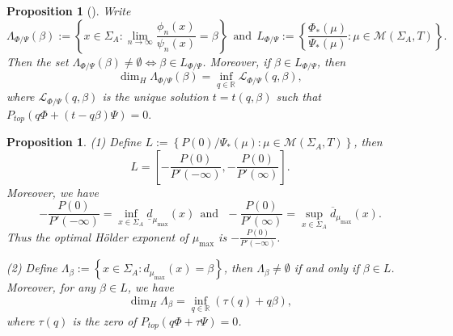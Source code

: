 \documentclass[reqno,11pt,graphicx,]{amsart}
\numberwithin{equation}{section}
\theoremstyle{plain}
\newcommand{\3}{\mathbf{3}}
\newcommand{\mw}{x}
\newtheorem{proposition}[theorem]{Proposition}
\begin{document}
	\begin{proposition}[]\label{Qu}
		Write$$
		\Lambda_{\Phi/\Psi}(\beta):=\left\{x\in\Sigma_{A}:\lim\limits_{n\to\infty}\frac{\phi_n(x)}{\psi_n(x)}=\beta\right\}\ \ \text{and}\ \  L_{\Phi/\Psi}:=\left\{\frac{\Phi_*(\mu)}{\Psi_*(\mu)}:\mu\in\mathcal{M}(\Sigma_A,T)\right\}.
		$$
		Then the set
		$\Lambda_{\Phi/\Psi}(\beta)\neq\emptyset\Leftrightarrow
		\beta\in L_{\Phi/\Psi}$. Moreover, if $\beta\in L_{\Phi/\Psi}$, then 
		\begin{equation*}
			\dim_H\Lambda_{\Phi/\Psi}(\beta)=\inf_{q\in{\mathbb{R}}}\mathcal{L}_{\Phi/\Psi}(q,\beta),
		\end{equation*}
		where $\mathcal{L}_{\Phi/\Psi}(q,\beta)$ is the unique solution $
		t=t(q,\beta)$ such that $
		P_{top}(q\Phi+(t-q\beta)\Psi)=0.$
	\end{proposition}	
	\begin{proposition}
		\label{dos-mu-ana} %
		(1) Define $L:=\left\{P(0)/\Psi_*(\mu):\mu\in\mathcal{M}%
		(\Sigma_A,T)\right\}$, then  
		\begin{equation}\label{beta=psi}
			L=\left[-\frac{P(0)}{P'(-\infty)},-\frac{P(0)}{P'(\infty)}\right].
		\end{equation}
		Moreover, we have
		\begin{equation}\label{beta-lower-upper}
			-\frac{P(0)}{P'(-\infty)}=\inf_{x\in\Sigma_{A}}\underline{d}_{\mu_{\max}}(x)\ \ \text{and}\ \ \ -\frac{P(0)}{P'(\infty)}=	\sup_{x\in\Sigma_{A}}\overline{d}_{\mu_{\max}}(x).
		\end{equation}
		Thus the optimal H\"older exponent of $\mu_{\max}$ is $-\frac{P(0)}{P'(-\infty)}$.
		
		(2) Define $\Lambda_{\beta}:=\left\{\mw\in\Sigma_A:d_{\mu_{\max}}(\mw)=\beta\right\}$, then $\Lambda_{\beta}\neq\emptyset$
		if and only if $\beta\in L$. Moreover, for any $\beta\in L$, we have 
		\begin{equation*}
			\dim_H\Lambda_{\beta}=\inf_{q\in{\mathbb{R}}}(\tau(q)+q\beta),
		\end{equation*}
		where $\tau(q)$ is the zero of $P_{top}(q\Phi+\tau\Psi)=0$. 
	\end{proposition}
	
\end{document}
